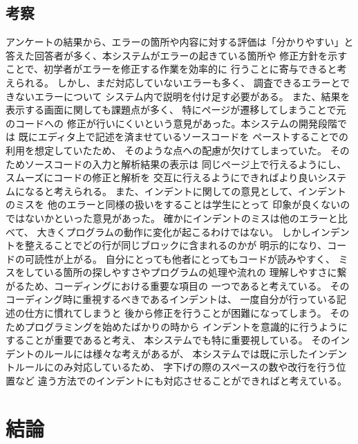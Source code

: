 \documentclass{csspaper}
\begin{document}
      \section{考察}
      アンケートの結果から、エラーの箇所や内容に対する評価は「分かりやすい」と
      答えた回答者が多く、本システムがエラーの起きている箇所や
      修正方針を示すことで、初学者がエラーを修正する作業を効率的に
      行うことに寄与できると考えられる。
      しかし、まだ対応していないエラーも多く、
      調査できるエラーとできないエラーについて
      システム内で説明を付け足す必要がある。
      また、結果を表示する画面に関しても課題点が多く、
      特にページが遷移してしまうことで元のコードへの
      修正が行いにくいという意見があった。本システムの開発段階では
      既にエディタ上で記述を済ませているソースコードを
      ペーストすることでの利用を想定していたため、
      そのような点への配慮が欠けてしまっていた。
      そのためソースコードの入力と解析結果の表示は
      同じページ上で行えるようにし、スムーズにコードの修正と解析を
      交互に行えるようにできればより良いシステムになると考えられる。
      また、インデントに関しての意見として、インデントのミスを
      他のエラーと同様の扱いをすることは学生にとって
      印象が良くないのではないかといった意見があった。
      確かにインデントのミスは他のエラーと比べて、
      大きくプログラムの動作に変化が起こるわけではない。
      しかしインデントを整えることでどの行が同じブロックに含まれるのかが
      明示的になり、コードの可読性が上がる。
      自分にとっても他者にとってもコードが読みやすく、
      ミスをしている箇所の探しやすさやプログラムの処理や流れの
      理解しやすさに繋がるため、コーディングにおける重要な項目の
      一つであると考えている。
      そのコーディング時に重視するべきであるインデントは、
      一度自分が行っている記述の仕方に慣れてしまうと
      後から修正を行うことが困難になってしまう。
      そのためプログラミングを始めたばかりの時から
      インデントを意識的に行うようにすることが重要であると考え、
      本システムでも特に重要視している。
      そのインデントのルールには様々な考えがあるが、
      本システムでは既に示したインデントルールにのみ対応しているため、
      字下げの際のスペースの数や改行を行う位置など
      違う方法でのインデントにも対応させることができればと考えている。

   \chapter{結論}
\end{document}
